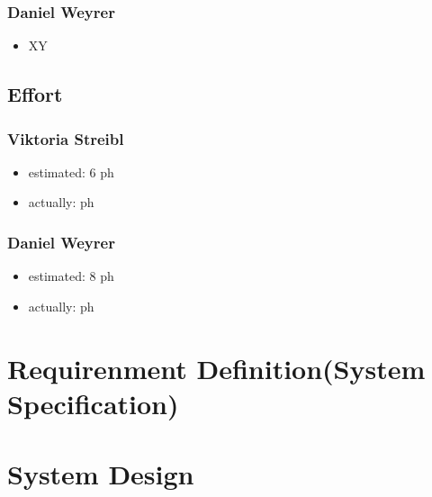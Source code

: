 \subsubsection{Daniel Weyrer}
\begin{itemize}
	\item XY
	
\end{itemize}

\subsection{Effort}

\subsubsection {Viktoria Streibl}
\begin{itemize}
	\item estimated: 6 ph 
	\item actually:  ph
\end{itemize}

\subsubsection {Daniel Weyrer}
\begin{itemize}
	\item estimated: 8 ph 
	\item actually:  ph
\end{itemize}

\section{Requirenment Definition(System Specification)}


\section{System Design}
